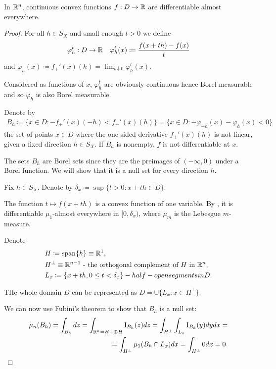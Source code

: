 \begin{theorem}\label{thm:rn_continuous_convex_frechet_almost_everywhere}\cite[exercise 1.17]{Phelps1993}
  In $\mathbb R^n$, continuous convex functions $f: D \to \mathbb R$ are differentiable almost everywhere.
\end{theorem}
\begin{proof}
  For all $h \in S_X$ and small enough $t > 0$ we define
  \begin{align*}
    &\varphi_h^t: D \to \mathbb R
    &\varphi_h^t(x) \coloneqq \frac {f(x + th) - f(x)} t
  \end{align*}
  and $\varphi_h(x) \coloneqq f_+'(x)(h) = \lim_{t \downarrow 0} \varphi_h^t(x)$.

  Considered as functions of $x$, $\varphi_h^t$ are obviously continuous hence Borel measurable and so $\varphi_h$ is also Borel measurable.

  Denote by
  \begin{align*}
    B_h
    \coloneqq
    \{ x \in D \colon -f_+'(x)(-h) < f_+'(x)(h) \}
    =
    \{ x \in D \colon -\varphi_{-h}(x) - \varphi_h(x) < 0 \}
  \end{align*}
  the set of points $x \in D$ where the one-sided derivative $f_+'(x)(h)$ is not linear, given a fixed direction $h \in S_X$. If $B_h$ is nonempty, $f$ is not differentiable at $x$.

  The sets $B_h$ are Borel sets since they are the preimages of $(-\infty, 0)$ under a Borel function. We will show that it is a null set for every direction $h$.

  Fix $h \in S_X$. Denote by $\delta_x \coloneqq \sup \{ t > 0 \colon x + th \in D \}$.

  The function $t \mapsto f(x + th)$ is a convex function of one variable. By \cite[theorem 1.16]{Phelps1993}, it is differentiable $\mu_1$-almost everywhere in $[0, \delta_x)$, where $\mu_m$ is the Lebesgue $m$-measure.

  Denote
  \begin{align*}
    &H \coloneqq \operatorname{span}\{ h \} \equiv \mathbb R^1,
    \\
    &H^\perp \equiv \mathbb R^{n-1} \text{ - the orthogonal complement of $H$ in $\mathbb R^n$},
    \\
    &L_x \coloneqq \{ x + th, 0 \leq t < \delta_x \} - half-open segments in D.
  \end{align*}

  THe whole domain $D$ can be represented as $D = \cup \{ L_x \colon x \in H^\perp \}$.

  We can now use Fubini's theorem to show that $B_h$ is a null set:
  \begin{align*}
    \mu_n(B_h)
    =
    \int_{B_h} dz
    =
    \int_{\mathbb R^n = H^\perp \oplus H} \operatorname{I}_{B_h} (z) dz
    =
    \int_{H^\perp} \int_{L_x} \operatorname{I}_{B_h} (y) dy dx
    = \\ =
    \int_{H^\perp} \mu_1(B_h \cap L_x) dx
    =
    \int_{H^\perp} 0 dx
    =
    0.
  \end{align*}


\end{proof}
